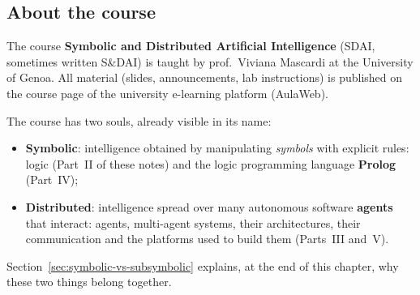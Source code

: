 \subsection{About the course}
\label{sec:about-the-course}

The course \textbf{Symbolic and Distributed Artificial Intelligence} (SDAI, sometimes
written S\&DAI) is taught by prof.\ Viviana Mascardi at the University of Genoa. All
material (slides, announcements, lab instructions) is published on the course page of the
university e-learning platform (AulaWeb).

The course has two souls, already visible in its name:
\begin{itemize}[nosep]
  \item \textbf{Symbolic}: intelligence obtained by manipulating \emph{symbols} with explicit
        rules: logic (Part~II of these notes) and the logic programming language
        \textbf{Prolog} (Part~IV);
  \item \textbf{Distributed}: intelligence spread over many autonomous software
        \textbf{agents} that interact: agents, multi-agent systems, their architectures,
        their communication and the platforms used to build them (Parts~III and~V).
\end{itemize}
Section~\ref{sec:symbolic-vs-subsymbolic} explains, at the end of this chapter, why these
two things belong together.
